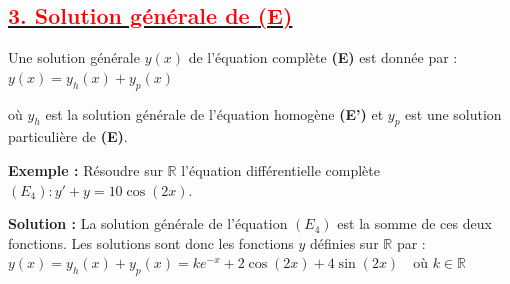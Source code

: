 \documentclass[12pt,a4paper]{article}
\begin{document}
\subsection*{\underline{\textbf{\textcolor{red}{3. Solution générale de \textbf{(E)}}}}}
Une solution générale $y(x)$ de l'équation complète \textbf{(E)} est donnée par :
$ y(x) = y_h(x) + y_p(x) $

où $y_h$ est la solution générale de l'équation homogène \textbf{(E')} et $y_p$ est une solution particulière de \textbf{(E)}.

\noindent\textbf{Exemple :} 
Résoudre sur $\mathbb{R}$ l'équation différentielle complète $(E_4) : y' + y = 10\cos(2x)$.

\textbf{Solution :}  
La solution générale de l'équation $(E_4)$ est la somme de ces deux fonctions. Les solutions sont donc les fonctions $y$ définies sur $\mathbb{R}$ par :
$ y(x) = y_h(x) + y_p(x) = k e^{-x} + 2\cos(2x) + 4\sin(2x) \quad \text{où } k \in \mathbb{R} $
\end{document}
